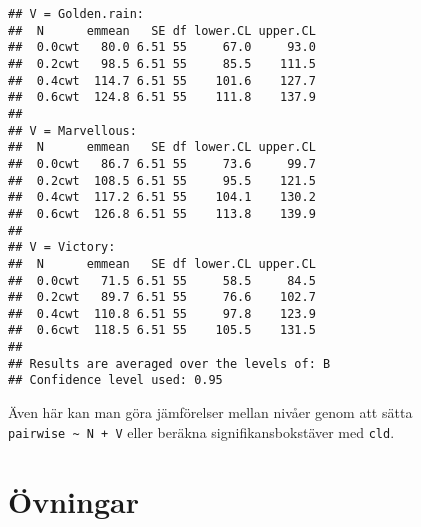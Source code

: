 \documentclass[
]{book}
\theoremstyle{definition}
\theoremstyle{definition}
\theoremstyle{definition}
\theoremstyle{definition}
\theoremstyle{remark}
\begin{document}
\begin{verbatim}
## V = Golden.rain:
##  N      emmean   SE df lower.CL upper.CL
##  0.0cwt   80.0 6.51 55     67.0     93.0
##  0.2cwt   98.5 6.51 55     85.5    111.5
##  0.4cwt  114.7 6.51 55    101.6    127.7
##  0.6cwt  124.8 6.51 55    111.8    137.9
## 
## V = Marvellous:
##  N      emmean   SE df lower.CL upper.CL
##  0.0cwt   86.7 6.51 55     73.6     99.7
##  0.2cwt  108.5 6.51 55     95.5    121.5
##  0.4cwt  117.2 6.51 55    104.1    130.2
##  0.6cwt  126.8 6.51 55    113.8    139.9
## 
## V = Victory:
##  N      emmean   SE df lower.CL upper.CL
##  0.0cwt   71.5 6.51 55     58.5     84.5
##  0.2cwt   89.7 6.51 55     76.6    102.7
##  0.4cwt  110.8 6.51 55     97.8    123.9
##  0.6cwt  118.5 6.51 55    105.5    131.5
## 
## Results are averaged over the levels of: B 
## Confidence level used: 0.95
\end{verbatim}

Även här kan man göra jämförelser mellan nivåer genom att sätta \texttt{pairwise\ \textasciitilde{}\ N\ +\ V} eller beräkna signifikansbokstäver med \texttt{cld}.

\hypertarget{uxf6vningar-4}{%
\section{Övningar}\label{uxf6vningar-4}}
\end{document}
